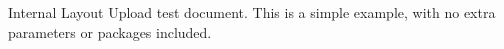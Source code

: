 \documentclass{article}
\begin{document}
Internal Layout Upload test document. This is a simple example, with no extra parameters or packages included.
\end{document}
